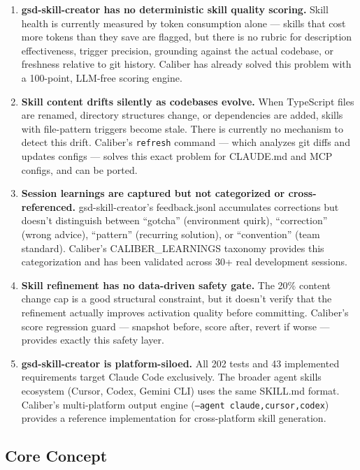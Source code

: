 \documentclass[11pt,letterpaper]{article}
\begin{document}
\begin{enumerate}
  \item \textbf{gsd-skill-creator has no deterministic skill quality scoring.} Skill health is currently measured by token consumption alone — skills that cost more tokens than they save are flagged, but there is no rubric for description effectiveness, trigger precision, grounding against the actual codebase, or freshness relative to git history. Caliber has already solved this problem with a 100-point, LLM-free scoring engine.

  \item \textbf{Skill content drifts silently as codebases evolve.} When TypeScript files are renamed, directory structures change, or dependencies are added, skills with file-pattern triggers become stale. There is currently no mechanism to detect this drift. Caliber's \texttt{refresh} command — which analyzes git diffs and updates configs — solves this exact problem for CLAUDE.md and MCP configs, and can be ported.

  \item \textbf{Session learnings are captured but not categorized or cross-referenced.} gsd-skill-creator's feedback.jsonl accumulates corrections but doesn't distinguish between ``gotcha'' (environment quirk), ``correction'' (wrong advice), ``pattern'' (recurring solution), or ``convention'' (team standard). Caliber's CALIBER\_LEARNINGS taxonomy provides this categorization and has been validated across 30+ real development sessions.

  \item \textbf{Skill refinement has no data-driven safety gate.} The 20\% content change cap is a good structural constraint, but it doesn't verify that the refinement actually improves activation quality before committing. Caliber's score regression guard — snapshot before, score after, revert if worse — provides exactly this safety layer.

  \item \textbf{gsd-skill-creator is platform-siloed.} All 202 tests and 43 implemented requirements target Claude Code exclusively. The broader agent skills ecosystem (Cursor, Codex, Gemini CLI) uses the same SKILL.md format. Caliber's multi-platform output engine (\texttt{--agent claude,cursor,codex}) provides a reference implementation for cross-platform skill generation.
\end{enumerate}

\subsection{Core Concept}
\end{document}
